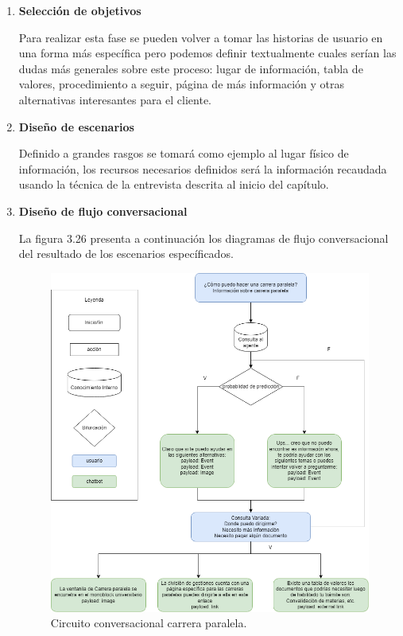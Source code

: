 \documentclass[letter, openright, 12pt]{book}
\begin{document}
{\begin{enumerate}[label=(\alph*)]
	\item \textbf{Selección de objetivos}
	\par Para realizar esta fase se pueden volver a tomar las historias de usuario en una forma más específica pero podemos definir textualmente cuales serían las dudas más generales sobre este proceso: lugar de información, tabla de valores, procedimiento a seguir, página de más información y otras alternativas interesantes para el cliente. 
	
	\item \textbf{Diseño de escenarios}
	\par Definido a grandes rasgos se tomará como ejemplo al lugar físico de información, los recursos necesarios definidos será la información recaudada usando la técnica de la entrevista descrita al inicio del capítulo.
	
	\item \textbf{Diseño de flujo conversacional}
	
	\par La figura 3.26 presenta a continuación los diagramas de flujo conversacional del resultado de los escenarios específicados. 
	\begin{figure}[H]
\centering
\includegraphics[width=1\textwidth]{figura3_26}
 \caption{Circuito conversacional carrera paralela.  }
\label{fig:figura3_26}
\end{figure}
	

\end{enumerate}}
\end{document}
